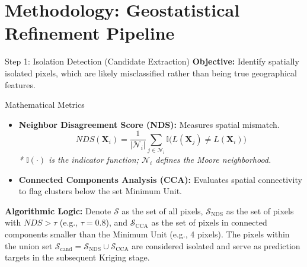 \documentclass[10pt, aspectratio=169]{beamer}
\begin{document}
\section{Methodology: Geostatistical Refinement Pipeline}

\begin{frame}{Step 1: Isolation Detection (Candidate Extraction)}
    \textbf{Objective:} Identify spatially isolated pixels, which are likely misclassified rather than being true geographical features.

    \begin{block}{Mathematical Metrics}
        \begin{itemize}
            \item \textbf{Neighbor Disagreement Score (NDS):} Measures spatial mismatch.
                  \begin{equation}
                      NDS(\mathbf{X}_i) = \frac{1}{|\mathcal{N}_i|} \sum_{j \in \mathcal{N}_i} \mathbb{I}\Big(L(\mathbf{X}_j) \neq L(\mathbf{X}_i)\Big)
                  \end{equation}
                  \textit{* $\mathbb{I}(\cdot)$ is the indicator function; $\mathcal{N}_i$ defines the Moore neighborhood.}

            \item \textbf{Connected Components Analysis (CCA):} Evaluates spatial connectivity to flag clusters below the set Minimum Unit.
        \end{itemize}
    \end{block}


    \textbf{Algorithmic Logic:}
    Denote $\mathcal{S}$ as the set of all pixels, $\mathcal{S}_{\text{NDS}}$ as the set of pixels with $NDS > \tau$ (e.g., $\tau=0.8$), and $\mathcal{S}_{\text{CCA}}$ as the set of pixels in connected components smaller than the Minimum Unit (e.g., 4 pixels).
    The pixels within the union set $\mathcal{S}_{\text{cand}} = \mathcal{S}_{\text{NDS}} \cup \mathcal{S}_{\text{CCA}}$ are considered isolated and serve as prediction targets in the subsequent Kriging stage.
\end{frame}
\end{document}
